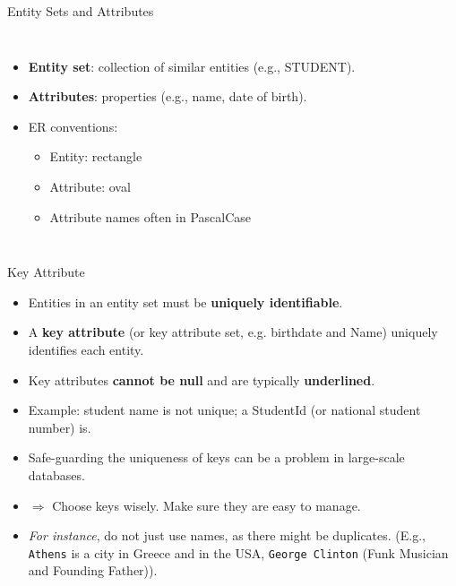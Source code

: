\documentclass[10pt,aspectratio=169]{beamer}
\newcommand{\keyattr}[1]{\underline{#1}}
\begin{document}
\begin{frame}{Entity Sets and Attributes}
\begin{columns}[T,onlytextwidth]
\begin{itemize}
  \item \textbf{Entity set}: collection of similar entities (e.g., STUDENT).
  \item \textbf{Attributes}: properties (e.g., name, date of birth).
  \item ER conventions:
  \begin{itemize}
    \item Entity: rectangle
    \item Attribute: oval
    \item Attribute names often in PascalCase
  \end{itemize}
\end{itemize}

\centering
{}
\end{columns}
\end{frame}

\begin{frame}{Key Attribute}
\begin{itemize}
  \item Entities in an entity set must be \textbf{uniquely identifiable}.
  \item A \textbf{key attribute} (or key attribute set, e.g. birthdate and Name) uniquely identifies each entity.
  \item Key attributes \textbf{cannot be null} and are typically \textbf{underlined}.
  \item Example: student name is not unique; a StudentId (or national student number) is.
  \item Safe-guarding the uniqueness of keys can be a problem in large-scale databases. 
  \item[] $\Rightarrow$ Choose keys wisely. Make sure they are easy to manage.
  \item[] \textit{For instance}, do not just use names, as there might be duplicates. (E.g., \texttt{Athens} is a city in Greece and in the USA, \texttt{George Clinton} (Funk Musician and Founding Father)).
\end{itemize}
\end{frame}
\end{document}
